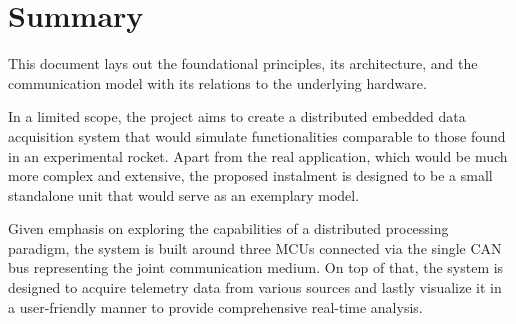 \chapter{Summary}\label{ch:conclusion}
This document lays out the foundational principles, its architecture, and the communication model with
its relations to the underlying hardware.

In a limited scope, the project aims to create a distributed embedded data acquisition system that would simulate
functionalities comparable to those found in an experimental rocket.
Apart from the real application, which would be much more complex and extensive, the proposed instalment is designed to
be a small standalone unit that would serve as an exemplary model.

Given emphasis on exploring the capabilities of a distributed processing paradigm, the system is built around three
MCUs connected via the single CAN bus representing the joint communication medium.
On top of that, the system is designed to acquire telemetry data from various sources
and lastly visualize it in a user-friendly manner to provide comprehensive real-time analysis.
